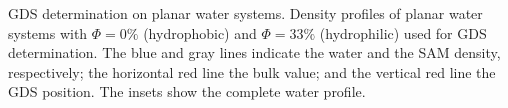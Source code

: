 \label{fig:GDSptensor}GDS determination on planar water systems.
Density profiles of planar water systems with $\Phi=0\%$ (hydrophobic)
and $\Phi=33\%$ (hydrophilic) used for GDS determination. The blue
and gray lines indicate the water and the SAM density, respectively;
the horizontal red line the bulk value; and the vertical red line
the GDS position. The insets show the complete water profile.